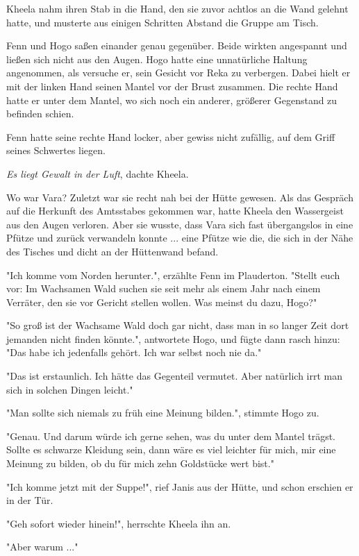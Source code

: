 \documentclass[10pt, a4paper, oneside]{book}
\begin{document}
\begin{multicols}{2}
Kheela nahm ihren Stab in die Hand, den sie zuvor achtlos an die Wand gelehnt hatte, und musterte aus einigen Schritten Abstand die Gruppe am Tisch. 

Fenn und Hogo saßen einander genau gegenüber. Beide wirkten angespannt und ließen sich nicht aus den Augen. Hogo hatte eine unnatürliche Haltung angenommen, als versuche er, sein Gesicht vor Reka zu verbergen. Dabei hielt er mit der linken Hand seinen Mantel vor der Brust zusammen. Die rechte Hand hatte er unter dem Mantel, wo sich noch ein anderer, größerer Gegenstand zu befinden schien. 

Fenn hatte seine rechte Hand locker, aber gewiss nicht zufällig, auf dem Griff seines Schwertes liegen. 

\textit{Es liegt Gewalt in der Luft}, dachte Kheela. 

Wo war Vara? Zuletzt war sie recht nah bei der Hütte gewesen. Als das Gespräch auf die Herkunft des Amtsstabes gekommen war, hatte Kheela den Wassergeist aus den Augen verloren. Aber sie wusste, dass Vara sich fast übergangslos in eine Pfütze und zurück verwandeln konnte ... eine Pfütze wie die, die sich in der Nähe des Tisches und dicht an der Hüttenwand befand. 

"Ich komme vom Norden herunter.", erzählte Fenn im Plauderton. "Stellt euch vor: Im Wachsamen Wald suchen sie seit mehr als einem Jahr nach einem Verräter, den sie vor Gericht stellen wollen. Was meinst du dazu, Hogo?" 

"So groß ist der Wachsame Wald doch gar nicht, dass man in so langer Zeit dort jemanden nicht finden könnte.", antwortete Hogo, und fügte dann rasch hinzu: "Das habe ich jedenfalls gehört. Ich war selbst noch nie da." 

"Das ist erstaunlich. Ich hätte das Gegenteil vermutet. Aber natürlich irrt man sich in solchen Dingen leicht." 

"Man sollte sich niemals zu früh eine Meinung bilden.", stimmte Hogo zu. 

"Genau. Und darum würde ich gerne sehen, was du unter dem Mantel trägst. Sollte es schwarze Kleidung sein, dann wäre es viel leichter für mich, mir eine Meinung zu bilden, ob du für mich zehn Goldstücke wert bist." 

"Ich komme jetzt mit der Suppe!", rief Janis aus der Hütte, und schon erschien er in der Tür. 

"Geh sofort wieder hinein!", herrschte Kheela ihn an. 

"Aber warum ..." 


\end{multicols}
\end{document}
